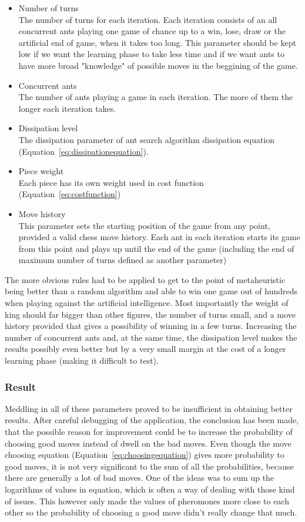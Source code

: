 \documentclass[pdftex]{article}
\begin{document}
\begin{itemize}
 	\item Number of turns \hfill \\
The number of turns for each iteration. Each iteration consists of an all concurrent ants playing one game of chance up to a win, lose, draw or the artificial end of game, when it takes too long. This parameter should be kept low if we want the learning phase to take less time and if we want ants to have more broad "knowledge" of possible moves in the beggining of the game. 
	\item Concurrent ants \hfill \\
The number of ants playing a game in each iteration. The more of them the longer each iteration takes.
 	\item Dissipation level \hfill \\
The dissipation parameter of ant search algorithm dissipation equation (Equation~\ref{eq:dissipationequation}).
	\item Piece weight \hfill \\
Each piece has its own weight used in cost function (Equation~\ref{eq:costfunction})
	\item Move history \hfill \\
This parameter sets the starting position of the game from any point, provided a valid chess move history. Each ant in each iteration starts its game from this point and plays up until the end of the game (including the end of maximum number of turns defined as another parameter)
\end{itemize}

The more obvious rules had to be applied to get to the point of metaheuristic being better than a random algorithm and able to win one game out of hundreds when playing against the artificial intelligence. Most importantly the weight of king should far bigger than other figures, the number of turns small, and a move history provided that gives a possibility of winning in a few turns. Increasing the number of concurrent ants and, at the same time, the dissipation level makes the results possibly even better but by a very small margin at the cost of a longer learning phase (making it difficult to test).


\subsubsection{Result}

Meddling in all of these parameters proved to be insufficient in obtaining better results. After careful debugging of the application, the conclusion has been made, that the possible reason for improvement could be to increase the probability of choosing good moves instead of dwell on the bad moves. Even though the move choosing equation (Equation~\ref{eq:choosingequation}) gives more probability to good moves, it is not very significant to the sum of all the probabilities, because there are generally a lot of bad moves. One of the ideas was to sum up the logarithms of values in equation, which is often a way of dealing with those kind of issues. This however only made the values of pheromones more close to each other so the probability of choosing a good move didn't really change that much. 
\end{document}
